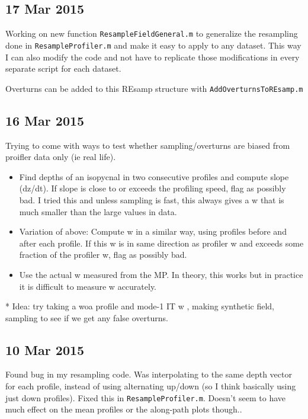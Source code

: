 \documentclass[11pt]{article}
\begin{document}
\clearpage
\newpage
\subsection{17 Mar 2015}

Working on new function \verb+ResampleFieldGeneral.m+ to generalize the resampling done in \verb+ResampleProfiler.m+ and make it easy to apply to any dataset. This way I can also modify the code and not have to replicate those modifications in every separate script for each dataset.

Overturns can be added to this REsamp structure with \verb+AddOverturnsToREsamp.m	+


\clearpage
\newpage
\subsection{16 Mar 2015}

Trying to come with ways to test whether sampling/overturns are biased from proifler data only (ie real life).
\begin{itemize}
\item Find depths of an isopycnal in two consecutive profiles and compute slope (dz/dt). If slope is close to or exceeds the profiling speed, flag as possibly bad. I tried this and unless sampling is fast, this always gives a w that is much smaller than the large values in data.
\item Variation of above: Compute w in a similar way, using profiles before and after each profile. If this w is in same direction as profiler w and exceeds some fraction of the profiler w, flag as possibly bad.
\item Use the actual w measured from the MP. In theory, this works but in practice it is difficult to measure w accurately.
\end{itemize}


* Idea: try taking a woa profile and mode-1 IT w , making synthetic field, sampling to see if we get any false overturns.



\clearpage
\newpage
\subsection{10 Mar 2015}

Found bug in my resampling code. Was interpolating to the same depth vector for each profile, instead of using alternating up/down (so I think basically using just down profiles). Fixed this in \verb+ResampleProfiler.m+. Doesn't seem to have much effect on the mean profiles or the along-path plots though..
\end{document}
